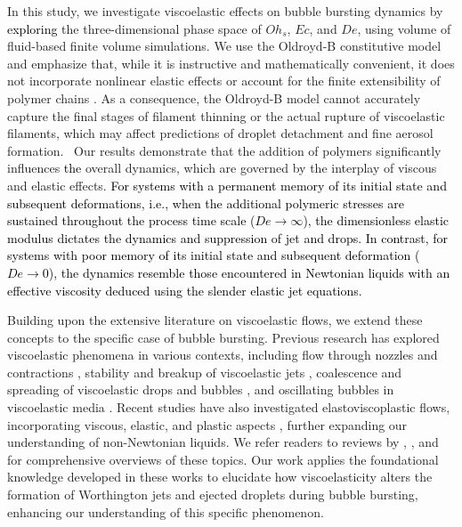 \documentclass{jfm}
\newcommand{\DL}[1]{{\textcolor{black}{#1}}}
\newcommand{\VS}[1]{{\textcolor{black}{#1}}}
\newcommand{\oo}{\color{magenta} \normalfont}
\newcommand{\bb}{\color{black} \normalfont}
\begin{document}
In this study, we investigate viscoelastic effects on bubble bursting dynamics by \DL{exploring} the three-dimensional phase space of $Oh_s$, $Ec$, and $De$, using volume of fluid-based finite volume simulations. \oo We use the Oldroyd-B constitutive model and emphasize that, while it is instructive and mathematically convenient, it does not incorporate nonlinear elastic effects \citep{alves2021numerical} or account for the finite extensibility of polymer chains \citep{yamani2023master}. As a consequence, the Oldroyd-B model cannot accurately capture the final stages of filament thinning or the actual rupture of viscoelastic filaments, which may affect predictions of droplet detachment and fine aerosol formation.\bb\,
Our results demonstrate that the addition of polymers significantly influences \DL{the} overall dynamics, which are governed by the interplay of viscous and elastic effects.
\VS{For systems with a permanent memory of its initial state and subsequent deformations, i.e., when the additional polymeric stresses are sustained throughout the process time scale ($De \to \infty$), the dimensionless elastic modulus dictates the dynamics and suppression of jet and drops.
In contrast, for systems with poor memory of its initial state and subsequent deformation ($De \to 0$), the dynamics resemble those encountered in Newtonian liquids with an effective viscosity deduced using the slender elastic jet equations.}

Building upon the extensive literature on viscoelastic flows, we extend these concepts to the specific case of bubble bursting.
Previous research has explored viscoelastic phenomena in various contexts, including flow through nozzles and contractions \citep{hinch1993flow, chen1991interfacial, boyko2024flow}, stability and breakup of viscoelastic jets \citep{middleman1965stability, goren1982surface, bousfield1986nonlinear, chang1999iterated, anna2001elasto,pandey2021elastic,sen2024elastocapillary, zinelis2023transition}, coalescence and spreading of viscoelastic drops and bubbles \citep{bouillant2022rapid, dekker2022elasticity, oratis2023coalescence}, and oscillating bubbles in viscoelastic media \citep{oratis2024unifying}.
Recent studies have also investigated elastoviscoplastic flows, incorporating viscous, elastic, and plastic aspects \citep{putz2009solid, varchanis2019modeling, francca2024elasto, ari2024bursting}, further expanding our understanding of non-Newtonian liquids.
We refer readers to reviews by \citet{bogy1979drop}, \citet{eggers1997nonlinear}, and \citet{yarin1993free} for comprehensive overviews of these topics.
Our work applies the foundational knowledge developed in these works to elucidate how viscoelasticity alters the formation of Worthington jets and ejected droplets during bubble bursting, enhancing our understanding of this specific phenomenon.
\end{document}
